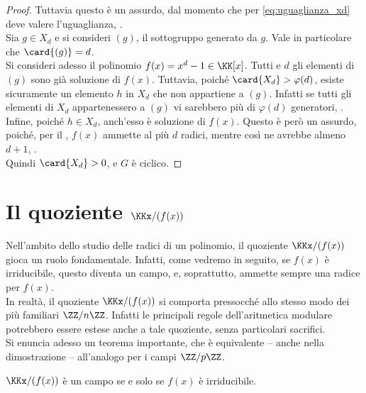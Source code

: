 \begin{proof}
    \vskip 0.1in

    Tuttavia questo è un assurdo, dal momento che per \eqref{eq:uguaglianza_xd}
    deve valere l'uguaglianza, \Lightning{}. \\

    Sia $g \in X_d$ e si consideri $(g)$, il sottogruppo generato da $g$.
    Vale in particolare che $\card{(g)} = d$. \\

    Si consideri adesso il polinomio $f(x)= x^d-1 \in \KK[x]$. Tutti e $d$ gli
    elementi di $(g)$ sono già soluzione di $f(x)$. Tuttavia, poiché
    $\card{X_d} > \varphi(d)$, esiste sicuramente un elemento $h$ in $X_d$ che
    non appartiene a $(g)$. Infatti se tutti gli elementi di $X_d$ appartenessero
    a $(g)$ vi sarebbero più di $\varphi(d)$ generatori, \Lightning{}. \\

    Infine, poiché $h \in X_d$, anch'esso è soluzione di $f(x)$. Questo è
    però un assurdo, poiché, per il , $f(x)$
    ammette al più $d$ radici, mentre così ne avrebbe almeno $d+1$, \Lightning{}. \\

    Quindi $\card{X_d}>0$, e $G$ è ciclico.
\end{proof}

\section{Il quoziente \texorpdfstring{$\KKx/(f(x))$}{K[x]/(f(x))}}

Nell'ambito dello studio delle radici di un polinomio,
il quoziente $\KKx/(f(x))$ gioca un ruolo fondamentale.
Infatti, come vedremo in seguito, se $f(x)$ è irriducibile,
questo diventa un campo, e, soprattutto, ammette sempre una
radice per $f(x)$. \\

In realtà, il quoziente $\KKx/(f(x))$ si comporta pressocché
allo stesso modo dei più familiari $\ZZ/n\ZZ$. Infatti
le principali regole dell'aritmetica modulare potrebbero
essere estese anche a tale quoziente, senza particolari
sacrifici. \\

Si enuncia adesso un teorema importante, che è equivalente --
anche nella dimostrazione -- all'analogo per i campi
$\ZZ/p\ZZ$.

\begin{theorem}
    \label{th:campo_quoziente_irriducibile}
    $\KKx/(f(x))$ è un campo se e solo se $f(x)$ è irriducibile.
\end{theorem}

